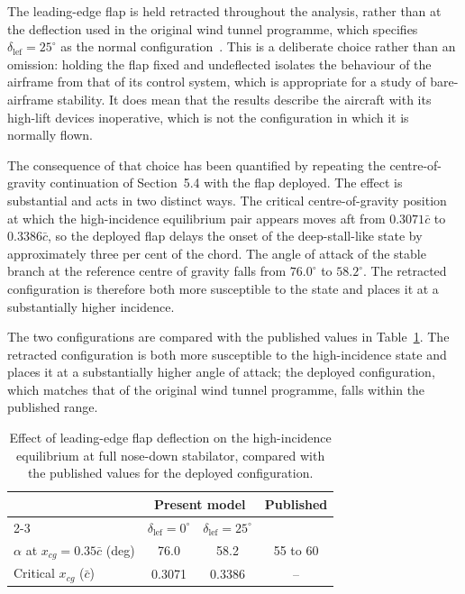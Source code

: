 \documentclass[
bindingoffset=5mm,  %
footnoteindent=3mm, %
hyphenation=true    %
]{src/wut-thesis}
\begin{document}
 
 The leading-edge flap is held retracted throughout the analysis, rather than
 at the deflection used in the original wind tunnel programme, which specifies
 $\delta_{\mathrm{lef}} = 25^{\circ}$ as the normal
 configuration~\cite{nguyen1979}. This is a deliberate choice rather than an
 omission: holding the flap fixed and undeflected isolates the behaviour of the
 airframe from that of its control system, which is appropriate for a study of
 bare-airframe stability. It does mean that the results describe the aircraft
 with its high-lift devices inoperative, which is not the configuration in
 which it is normally flown.
 
 The consequence of that choice has been quantified by repeating the
 centre-of-gravity continuation of Section~5.4 with the flap deployed. The
 effect is substantial and acts in two distinct ways. The critical
 centre-of-gravity position at which the high-incidence equilibrium pair
 appears moves aft from $0.3071\bar{c}$ to $0.3386\bar{c}$, so the deployed
 flap delays the onset of the deep-stall-like state by approximately three per
 cent of the chord. The angle of attack of the stable branch at the reference
 centre of gravity falls from $76.0^{\circ}$ to $58.2^{\circ}$. The retracted
 configuration is therefore both more susceptible to the state and places it at
 a substantially higher incidence.
 
 
 The two configurations are compared with the published values in
 Table~\ref{tab:lef}. The retracted configuration is both more susceptible to
 the high-incidence state and places it at a substantially higher angle of
 attack; the deployed configuration, which matches that of the original wind
 tunnel programme, falls within the published range.
 
 
 
 \begin{table}[htbp]
 	\centering
 	\caption{Effect of leading-edge flap deflection on the high-incidence
 		equilibrium at full nose-down stabilator, compared with the published
 		values for the deployed configuration.}
 	\label{tab:lef}
 	\begin{tabular}{lccc}
 		\hline
 		& \multicolumn{2}{c}{Present model} & Published \\
 		\cline{2-3}
 		& $\delta_{\mathrm{lef}} = 0^{\circ}$
 		& $\delta_{\mathrm{lef}} = 25^{\circ}$
 		& \cite{nguyen1979} \\
 		\hline
 		$\alpha$ at $x_{cg} = 0.35\bar{c}$ (deg)
 		& 76.0 & 58.2 & 55 to 60 \\
 		Critical $x_{cg}$ ($\bar{c}$)
 		& 0.3071 & 0.3386 & -- \\
 		\hline
 	\end{tabular}
 \end{table}
 
\end{document}
